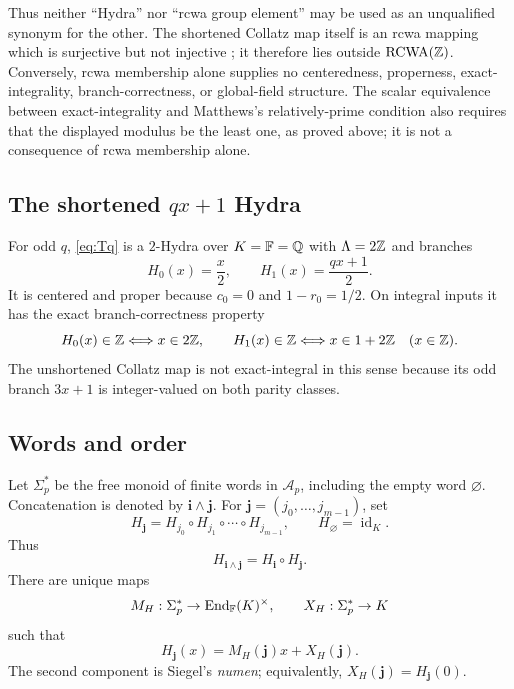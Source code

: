 Thus neither ``Hydra'' nor ``rcwa group element'' may be used as an
unqualified synonym for the other.  The shortened Collatz map itself is an
rcwa mapping which is surjective but not injective
\cite[Rem.~1.2]{KohlRCWA}; it therefore lies outside
$\operatorname{RCWA}(\mathbb Z)$.  Conversely, rcwa membership alone supplies no
centeredness, properness, exact-integrality, branch-correctness, or
global-field structure.  The scalar equivalence between exact-integrality and
Matthews's relatively-prime condition also requires that the displayed
modulus be the least one, as proved above; it is not a consequence of rcwa
membership alone.

\subsection{The shortened \texorpdfstring{$qx+1$}{qx+1} Hydra}

For odd $q$, \cref{eq:Tq} is a $2$-Hydra over $K=\mathbb F=\mathbb Q$ with
$\Lambda=2\mathbb Z$ and branches
\begin{equation}
\label{eq:Tq-branches}
 H_0(x)=\frac{x}{2},
 \qquad
 H_1(x)=\frac{qx+1}{2}.
\end{equation}
It is centered and proper because $c_0=0$ and $1-r_0=1/2$.  On integral
inputs it has the exact branch-correctness property
\[
 H_0(x)\in\mathbb Z\Longleftrightarrow x\in2\mathbb Z,
 \qquad
 H_1(x)\in\mathbb Z\Longleftrightarrow x\in1+2\mathbb Z
 \quad(x\in\mathbb Z).
\]
The unshortened Collatz map is not exact-integral in this sense because its
odd branch $3x+1$ is integer-valued on both parity classes.

\subsection{Words and order}

Let $\Sigma_p^*$ be the free monoid of finite words in $\mathcal A_p$,
including the empty word $\varnothing$.  Concatenation is denoted by
$\mathbf i\wedge\mathbf j$.  For
$\mathbf j=(j_0,\ldots,j_{m-1})$, set
\begin{equation}
\label{eq:word-composition}
 H_{\mathbf j}=H_{j_0}\circ H_{j_1}\circ\cdots\circ H_{j_{m-1}},
 \qquad H_\varnothing=\operatorname{id}_K.
\end{equation}
Thus
\begin{equation}
\label{eq:concat-composition}
 H_{\mathbf i\wedge\mathbf j}=H_{\mathbf i}\circ H_{\mathbf j}.
\end{equation}
There are unique maps
\[
 M_H:\Sigma_p^*\to\operatorname{End}_\mathbb F(K)^\times,
 \qquad X_H:\Sigma_p^*\to K
\]
such that
\begin{equation}
\label{eq:affine-word-decomposition}
 H_{\mathbf j}(x)=M_H(\mathbf j)x+X_H(\mathbf j).
\end{equation}
The second component is Siegel's \emph{numen}; equivalently,
$X_H(\mathbf j)=H_{\mathbf j}(0)$.

